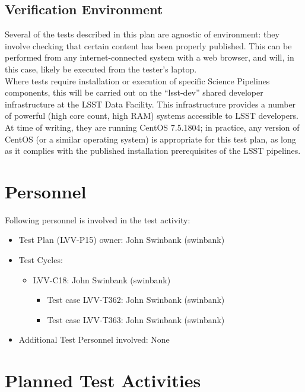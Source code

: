 \documentclass[DM,lsstdraft,STR,toc]{lsstdoc}
\begin{document}
\subsection{Verification Environment}
\label{sect:hwconf}
Several of the tests described in this plan are agnostic of environment:
they involve checking that certain content has been properly published.
This can be performed from any internet-connected system with a web
browser, and will, in this case, likely be executed from the tester's
laptop.\\[2\baselineskip]Where tests require installation or execution
of specific Science Pipelines components, this will be carried out on
the ``lsst-dev'' shared developer infrastructure at the LSST Data
Facility. This infrastructure provides a number of powerful (high core
count, high RAM) systems accessible to LSST developers. At time of
writing, they are running CentOS 7.5.1804; in practice, any version of
CentOS (or a similar operating system) is appropriate for this test
plan, as long as it complies with the published installation
prerequisites of the LSST pipelines.\\[2\baselineskip]





\section{Personnel}
\label{sect:personnel}

Following personnel is involved in the test activity:

\begin{itemize}
\item Test Plan (LVV-P15) owner: John Swinbank (swinbank)
\item Test Cycles:
\begin{itemize}
  \item LVV-C18: John Swinbank (swinbank)
  \begin{itemize}
    \item Test case LVV-T362: John Swinbank (swinbank)
    \item Test case LVV-T363: John Swinbank (swinbank)
  \end{itemize}
\end{itemize}
\item Additional Test Personnel involved: None
\end{itemize}

\newpage
\section{Planned Test Activities}
\label{sect:plannedtestactivities}
\end{document}
